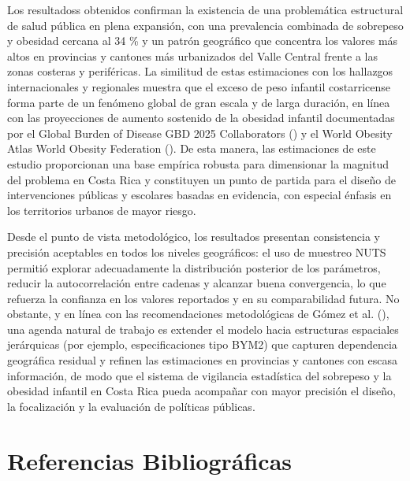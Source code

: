 \documentclass[
]{article}
\begin{document}
Los resultadoss obtenidos confirman la existencia de una problemática
estructural de salud pública en plena expansión, con una prevalencia
combinada de sobrepeso y obesidad cercana al 34 \% y un patrón
geográfico que concentra los valores más altos en provincias y cantones
más urbanizados del Valle Central frente a las zonas costeras y
periféricas. La similitud de estas estimaciones con los hallazgos
internacionales y regionales muestra que el exceso de peso infantil
costarricense forma parte de un fenómeno global de gran escala y de
larga duración, en línea con las proyecciones de aumento sostenido de la
obesidad infantil documentadas por el Global Burden of Disease GBD 2025
Collaborators () y el World Obesity Atlas
World Obesity Federation (). De
esta manera, las estimaciones de este estudio proporcionan una base
empírica robusta para dimensionar la magnitud del problema en Costa Rica
y constituyen un punto de partida para el diseño de intervenciones
públicas y escolares basadas en evidencia, con especial énfasis en los
territorios urbanos de mayor riesgo.

Desde el punto de vista metodológico, los resultados presentan
consistencia y precisión aceptables en todos los niveles geográficos: el
uso de muestreo NUTS permitió explorar adecuadamente la distribución
posterior de los parámetros, reducir la autocorrelación entre cadenas y
alcanzar buena convergencia, lo que refuerza la confianza en los valores
reportados y en su comparabilidad futura. No obstante, y en línea con
las recomendaciones metodológicas de Gómez et al.
(), una agenda natural de trabajo es
extender el modelo hacia estructuras espaciales jerárquicas (por
ejemplo, especificaciones tipo BYM2) que capturen dependencia geográfica
residual y refinen las estimaciones en provincias y cantones con escasa
información, de modo que el sistema de vigilancia estadística del
sobrepeso y la obesidad infantil en Costa Rica pueda acompañar con mayor
precisión el diseño, la focalización y la evaluación de políticas
públicas.

\section{Referencias
Bibliográficas}\label{referencias-bibliogruxe1ficas}
\end{document}
